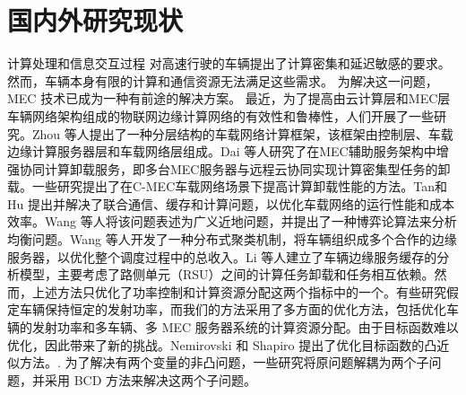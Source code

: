 \section{国内外研究现状}\label{section1-2}
计算处理和信息交互过程 对高速行驶的车辆提出了计算密集和延迟敏感的要求。然而，车辆本身有限的计算和通信资源无法满足这些需求。
为解决这一问题，MEC 技术已成为一种有前途的解决方案。
最近，为了提高由云计算层和MEC层车辆网络架构组成的物联网边缘计算网络的有效性和鲁棒性，人们开展了一些研究。Zhou \cite{Zhou2019}等人提出了一种分层结构的车载网络计算框架，该框架由控制层、车载边缘计算服务器层和车载网络层组成。Dai \cite{Dai2022}等人研究了在MEC辅助服务架构中增强协同计算卸载服务，即多台MEC服务器与远程云协同实现计算密集型任务的卸载。一些研究提出了在C-MEC车载网络场景下提高计算卸载性能的方法。Tan和Hu \cite{Tan2018}提出并解决了联合通信、缓存和计算问题，以优化车载网络的运行性能和成本效率。Wang \cite{Wang2020}等人将该问题表述为广义近地问题，并提出了一种博弈论算法来分析均衡问题。Wang \cite{Wang2022}等人开发了一种分布式聚类机制，将车辆组织成多个合作的边缘服务器，以优化整个调度过程中的总收入。Li \cite{Li2023}等人建立了车辆边缘服务缓存的分析模型，主要考虑了路侧单元（RSU）之间的计算任务卸载和任务相互依赖。然而，上述方法只优化了功率控制和计算资源分配这两个指标中的一个。有些研究假定车辆保持恒定的发射功率，而我们的方法采用了多方面的优化方法，包括优化车辆的发射功率和多车辆、多 MEC 服务器系统的计算资源分配。由于目标函数难以优化，因此带来了新的挑战。Nemirovski 和 Shapiro 提出了优化目标函数的凸近似方法。\cite{Nemirovski2007}. 为了解决有两个变量的非凸问题，一些研究将原问题解耦为两个子问题，并采用 BCD 方法来解决这两个子问题。
